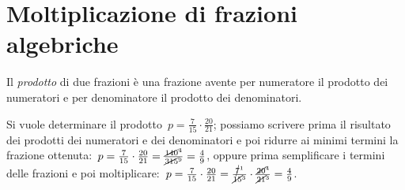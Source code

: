 \section{Moltiplicazione di frazioni algebriche}

Il \emph{prodotto} di due frazioni è una frazione avente per numeratore il prodotto dei numeratori e per denominatore il prodotto dei denominatori.

Si vuole determinare il prodotto~$p=\frac{7}{15}\cdot \frac{20}{21}$; possiamo scrivere prima il risultato dei prodotti
dei numeratori e dei denominatori e poi ridurre ai minimi termini la frazione
ottenuta:~$p=\frac{7}{15}\cdot \frac{20}{21}=\frac{\cancel{140}^4}{\cancel{315}^9}=\frac{4}{9}$,
oppure prima semplificare i termini delle frazioni e poi
moltiplicare:~$p=\frac{7}{15}\cdot \frac{20}{21}=\frac{\cancel{7}^1}{\cancel{15}^3}\cdot \frac{\cancel{20}^4}{\cancel{21}^3}=\frac{4}{9}$.
\pagebreak

